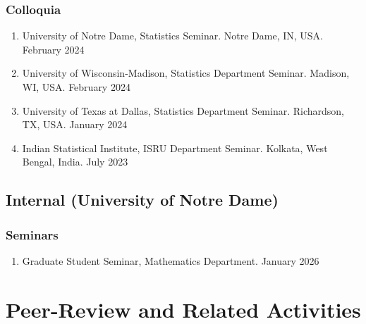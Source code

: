 \documentclass[letterpaper,oneside]{article}
\begin{document}
\subsubsection*{Colloquia}

\begin{enumerate}

  \item[@] University of Notre Dame, Statistics Seminar. Notre Dame, IN, USA. \hfill February 2024

  \item[@] University of Wisconsin-Madison, Statistics Department Seminar. Madison, WI, USA. \hfill February 2024

  \item[@] University of Texas at Dallas, Statistics Department Seminar. Richardson, TX, USA. \hfill January 2024

  \item[@] Indian Statistical Institute, ISRU Department Seminar. Kolkata, West Bengal, India. \hfill July 2023

\end{enumerate}


\subsection*{Internal (University of Notre Dame)}

\subsubsection*{Seminars} 
\begin{enumerate}
	\item[+] Graduate Student Seminar, Mathematics Department. \hfill January 2026 
\end{enumerate}

\section*{Peer-Review and Related Activities}
\end{document}
